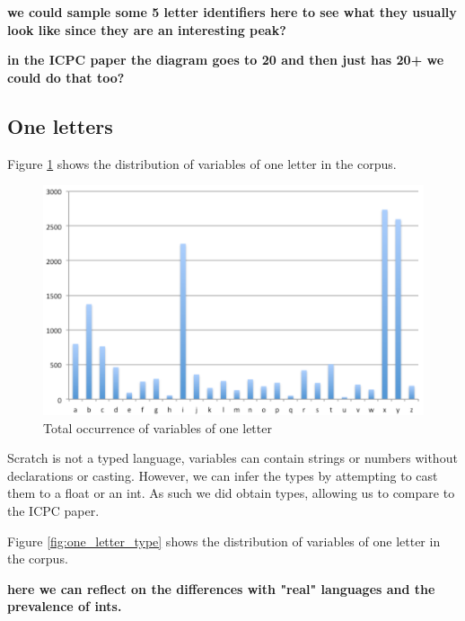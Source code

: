 \documentclass[conference]{IEEEtran}
\newcommand{\todo}[1]{ \textbf{#1} }
\begin{document}
\todo{we could sample some 5 letter identifiers here to see what they usually look like since they are an interesting peak?}

\todo{in the ICPC paper the diagram goes to 20 and then just has 20+ we could do that too?}
\subsection{One letters}

Figure \ref{fig:one_letter_occurrence} shows the distribution of variables of one letter in the corpus.

\begin{figure}[h]
	\begin{center}
		\includegraphics[width=\columnwidth]{fig/one_letter_occurrence}
		\caption{Total occurrence of variables of one letter}
		\label{fig:one_letter_occurrence}
	\end{center}
\end{figure} 

Scratch is not a typed language, variables can contain strings or numbers without declarations or casting. However, we can infer the types by attempting to cast them to a float or an int. As such we did obtain types, allowing us to compare to the ICPC paper.

Figure \ref{fig:one_letter_type} shows the distribution of variables of one letter in the corpus.

\todo{here we can reflect on the differences with "real" languages and the prevalence of ints.}
\end{document}
